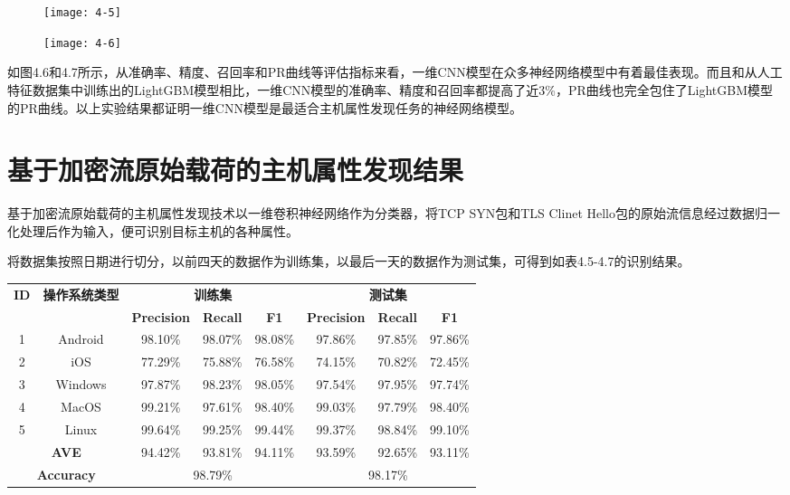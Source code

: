 \begin{figure}[!h]
    \centering
    \texttt{[image: 4-5]}
    \label{fig:4-4}
\end{figure}

\begin{figure}[!h]
    \centering
    \texttt{[image: 4-6]}
    \label{fig:4-4}
\end{figure}

如图4.6和4.7所示，从准确率、精度、召回率和PR曲线等评估指标来看，一维CNN模型在众多神经网络模型中有着最佳表现。而且和从人工特征数据集中训练出的LightGBM模型相比，一维CNN模型的准确率、精度和召回率都提高了近3\%，PR曲线也完全包住了LightGBM模型的PR曲线。以上实验结果都证明一维CNN模型是最适合主机属性发现任务的神经网络模型。



\section{基于加密流原始载荷的主机属性发现结果}

基于加密流原始载荷的主机属性发现技术以一维卷积神经网络作为分类器，将TCP SYN包和TLS Clinet Hello包的原始流信息经过数据归一化处理后作为输入，便可识别目标主机的各种属性。

将数据集按照日期进行切分，以前四天的数据作为训练集，以最后一天的数据作为测试集，可得到如表4.5-4.7的识别结果。

\begin{table}[!h]
    \centering
    \footnotesize
    \setlength{\tabcolsep}{8pt}
    \renewcommand{\arraystretch}{1}
\begin{tabular}{|c|c|c|c|c|c|c|c|}
\hline
\multirow{2}{*}{ \textbf{ID}} & \multirow{2}{*}{ \textbf{操作系统类型}} & \multicolumn{3}{c|}{ \textbf{训练集}} & \multicolumn{3}{c|}{ \textbf{测试集}} \\ \cline{3-8} 
 &  &  \textbf{Precision} &  \textbf{Recall} &  \textbf{F1} & \textbf{Precision} &  \textbf{Recall} &  \textbf{F1} \\ \hline
1 & Android & 98.10\% & 98.07\% & 98.08\% & 97.86\% & 97.85\% & 97.86\% \\ \hline
2 & iOS & 77.29\% & 75.88\% & 76.58\% & 74.15\% & 70.82\% & 72.45\% \\ \hline
3 & Windows & 97.87\% & 98.23\% & 98.05\% & 97.54\% & 97.95\% & 97.74\% \\ \hline
4 & MacOS & 99.21\% & 97.61\% & 98.40\% & 99.03\% & 97.79\% & 98.40\% \\ \hline
5 & Linux & 99.64\% & 99.25\% & 99.44\% & 99.37\% & 98.84\% & 99.10\% \\ \hline
\multicolumn{2}{|c|}{\textbf{AVE}} & 94.42\% & 93.81\% & 94.11\% & 93.59\% & 92.65\% & 93.11\%\\ \hline
\multicolumn{2}{|c|}{\textbf{Accuracy}} & \multicolumn{3}{c|}{98.79\%} & \multicolumn{3}{c|}{98.17\%} \\ \hline
\end{tabular}
\end{table}

